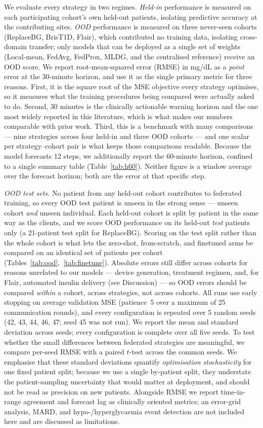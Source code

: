 \documentclass[10pt,letterpaper]{article}
\begin{document}
We evaluate every strategy in two regimes. \emph{Held-in} performance is measured
on each participating cohort's own held-out patients, isolating predictive
accuracy at the contributing sites. \emph{OOD} performance is measured on three
never-seen cohorts (ReplaceBG, BrisT1D, Flair), which contributed no training
data, isolating cross-domain transfer; only models that can be deployed as a
single set of weights (Local-mean, FedAvg, FedProx, MLDG, and the centralised
reference) receive an OOD score.
We report root-mean-squared error (RMSE) in mg/dL as a \emph{point} error at the
30-minute horizon, and use it as the single primary metric for three reasons.
First, it is the square root of the MSE objective every strategy optimises, so it
measures what the training procedures being compared were actually asked to do.
Second, 30 minutes is the clinically actionable warning horizon and the one most
widely reported in this literature, which is what makes our numbers comparable
with prior work. Third, this is a benchmark with many comparisons --- nine
strategies across four held-in and three OOD cohorts --- and one scalar per
strategy--cohort pair is what keeps those comparisons readable. Because the model
forecasts 12 steps, we additionally report the 60-minute horizon, confined to a
single summary table (Table~\ref{tab:h60}). Neither figure is a window average
over the forecast horizon; both are the error at that specific step.

\emph{OOD test sets.} No patient from any held-out cohort contributes to federated
training, so every OOD test patient is unseen in the strong sense --- unseen
cohort \emph{and} unseen individual. Each held-out cohort is split by patient in
the same way as the clients, and we score OOD performance on its held-out
\emph{test} patients only (a 21-patient test split for ReplaceBG). Scoring on the
test split rather than the whole cohort is what lets the zero-shot, from-scratch,
and finetuned arms be compared on an identical set of patients per cohort
(Tables~\ref{tab:ood},~\ref{tab:finetune}). Absolute errors still differ across
cohorts for reasons unrelated to our models --- device generation, treatment
regimen, and, for Flair, automated insulin delivery (see Discussion) --- so OOD
errors should be compared \emph{within} a cohort, across strategies, not across
cohorts. All runs use early stopping on average validation MSE (patience~5 over a
maximum of 25 communication rounds), and every configuration is repeated over 5
random seeds (42, 43, 44, 46, 47; seed 45 was not run). We report the mean and
standard deviation across seeds; every configuration is complete over all five
seeds. To test whether the small differences between federated
strategies are meaningful, we compare per-seed RMSE with a paired $t$-test across
the common seeds. We emphasise that these standard deviations quantify
\emph{optimisation stochasticity} for one fixed patient split; because we use a
single by-patient split, they understate the patient-sampling uncertainty that
would matter at deployment, and should not be read as precision on new patients.
Alongside RMSE we report time-in-range agreement and forecast lag as
clinically oriented metrics; an error-grid analysis, MARD, and
hypo-/hyperglycaemia event detection are not included here and are discussed as
limitations.
\end{document}
